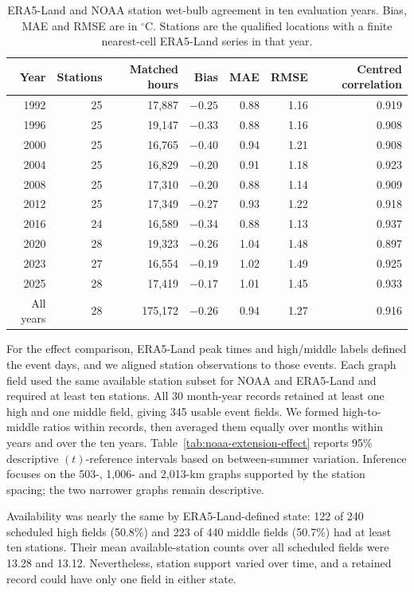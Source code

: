 \documentclass[namedate,webpdf,modern,mediumone]{oup-authoring-template}
\theoremstyle{thmstyleone}
\begin{document}
\begin{table}[htbp]
\centering
\caption{ERA5-Land and NOAA station wet-bulb agreement in ten
evaluation years. Bias, MAE and RMSE are in $^\circ$C. Stations are the
qualified locations with a finite nearest-cell ERA5-Land series in that
year.}
\label{tab:noaa-extension-measurement}
\footnotesize
\setlength{\tabcolsep}{5pt}
\begin{tabular}{rrrrrrr}
\toprule
Year & Stations & Matched hours & Bias & MAE & RMSE & Centred correlation \\
\midrule
1992 & 25 & 17,887 & $-0.25$ & 0.88 & 1.16 & 0.919 \\
1996 & 25 & 19,147 & $-0.33$ & 0.88 & 1.16 & 0.908 \\
2000 & 25 & 16,765 & $-0.40$ & 0.94 & 1.21 & 0.908 \\
2004 & 25 & 16,829 & $-0.20$ & 0.91 & 1.18 & 0.923 \\
2008 & 25 & 17,310 & $-0.20$ & 0.88 & 1.14 & 0.909 \\
2012 & 25 & 17,349 & $-0.27$ & 0.93 & 1.22 & 0.918 \\
2016 & 24 & 16,589 & $-0.34$ & 0.88 & 1.13 & 0.937 \\
2020 & 28 & 19,323 & $-0.26$ & 1.04 & 1.48 & 0.897 \\
2023 & 27 & 16,554 & $-0.19$ & 1.02 & 1.49 & 0.925 \\
2025 & 28 & 17,419 & $-0.17$ & 1.01 & 1.45 & 0.933 \\
\midrule
All years & 28 & 175,172 & $-0.26$ & 0.94 & 1.27 & 0.916 \\
\bottomrule
\end{tabular}
\end{table}

For the effect comparison, ERA5-Land peak times and high/middle labels defined
the event days, and we aligned station observations to those events. Each
graph field used the same available station subset
for NOAA and ERA5-Land and required at least ten stations. All 30
month-year records retained at least one high and one middle field, giving
345 usable event fields. We formed high-to-middle ratios within records, then
averaged them equally over months within years and over the ten years.
Table~\ref{tab:noaa-extension-effect} reports 95\% descriptive $(t)$-reference
intervals based on between-summer variation. Inference focuses
on the 503-, 1,006- and 2,013-km graphs supported by the station spacing; the
two narrower graphs remain descriptive.

Availability was nearly the same by ERA5-Land-defined state: 122 of 240
scheduled high fields (50.8\%) and 223 of 440 middle fields (50.7\%) had at
least ten stations. Their mean available-station counts over all scheduled
fields were 13.28 and 13.12. Nevertheless, station support varied over time,
and a retained record could have only one field in either state.
\end{document}

